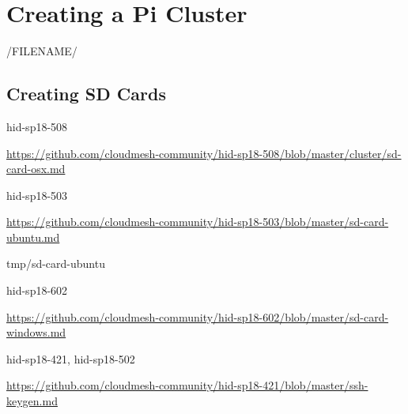 \chapter{Creating a Pi Cluster}

/FILENAME/

\section{Creating SD Cards}


\begin{IU}

hid-sp18-508

\url{https://github.com/cloudmesh-community/hid-sp18-508/blob/master/cluster/sd-card-osx.md}

\end{IU}



\begin{IU}

  hid-sp18-503 

  \url{https://github.com/cloudmesh-community/hid-sp18-503/blob/master/sd-card-ubuntu.md}

\end{IU}

 {tmp/sd-card-ubuntu}


\begin{IU}

  hid-sp18-602

  \url{https://github.com/cloudmesh-community/hid-sp18-602/blob/master/sd-card-windows.md}

\end{IU}




\begin{IU}

hid-sp18-421, hid-sp18-502

\url{https://github.com/cloudmesh-community/hid-sp18-421/blob/master/ssh-keygen.md}

\end{IU}

